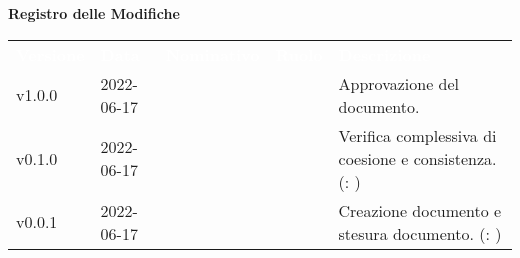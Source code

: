 

{\LARGE{\textbf{Registro delle Modifiche}}} \\
\begin{table}[!htbp]
\renewcommand{\arraystretch}{1.5}
\begin{tabular}{ m{}<{\centering}  m{}<{\centering}  m{}<{\centering}  m{}<{\centering}  m{}<{\centering} }
	\rowcolor{darkblue}
	\textcolor{white}{\textbf{Versione}} &\textcolor{white}{\textbf{Data}}& \textcolor{white}{\textbf{Nominativo}} & \textcolor{white}{\textbf{Ruolo}}&\textcolor{white}{\textbf{Descrizione}}\\ 

	v1.0.0 & 2022-06-17 & \MG & \RE & Approvazione del documento. \\

	v0.1.0& 2022-06-17 & \GC & \AN & Verifica complessiva di coesione e consistenza. (\VE: \textit{\MB})\\

	v0.0.1& 2022-06-17 & \GC & \AN & Creazione documento e stesura documento. (\VE: \textit{\MG})\\
	
\end{tabular}
\end{table}

\pagebreak